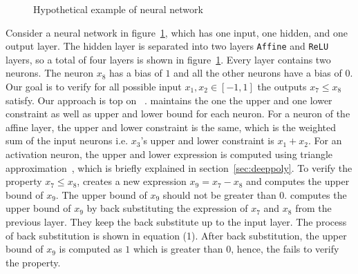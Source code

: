 \begin{figure}[t]
	\centering
	\scalebox{0.8}{}
	\caption{Hypothetical example of neural network}
	\label{fig:motivating}
\end{figure}
Consider a neural network in figure~\ref{fig:motivating},  which has one input, one hidden, and one output layer. The hidden layer is separated into two layers 
\texttt{Affine} and \texttt{ReLU} layers, so a total of four layers is shown in figure~\ref{fig:motivating}. 
Every layer contains two neurons. The neuron $x_8$ has a bias of $1$ and all the other neurons have a bias of $0$. 
Our goal is to verify for all possible input $x_1,x_2 \in [-1,1]$ the outputs $x_7 \leq x_8$ satisfy. 
Our approach is top on \deeppoly{}~\cite{singh2019abstract}. \deeppoly{} maintains the one the upper and one lower constraint
as well as upper and lower bound for each neuron. For a neuron of the affine layer, the upper and lower constraint is 
the same, which is the weighted sum of the input neurons i.e. $x_3$'s upper and lower constraint is $x_1+x_2$. 
For an activation neuron, the upper and lower expression is computed using triangle approximation~\cite{singh2019abstract}, 
which is briefly explained in section~\ref{sec:deeppoly}. To verify the property $x_7 \leq x_8$, \deeppoly{} creates a 
new expression $x_9 = x_7 - x_8$ and computes the upper bound of $x_9$. The upper bound of $x_9$ should not be greater
than $0$. \deeppoly{} computes the upper bound of $x_9$ by back substituting the expression of $x_7$ and $x_8$ 
from the previous layer.%
They keep the back substitute  up to the input layer. The process of back substitution is shown in equation (1). %
After back substitution, the upper bound of $x_9$ is computed as $1$ which is greater than $0$, 
hence, the \deeppoly{} fails to verify the property.


